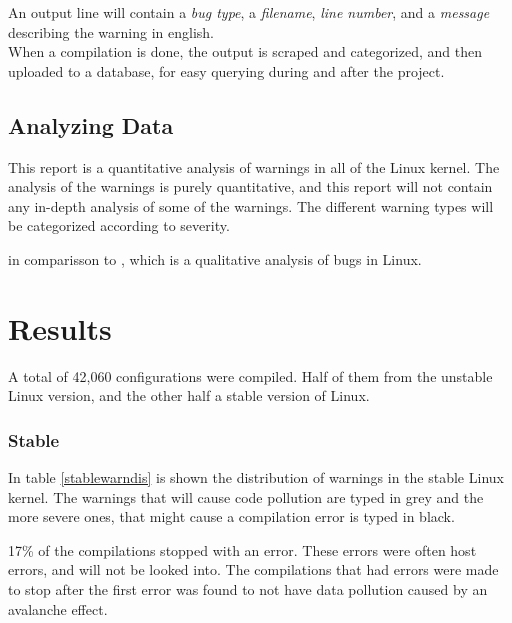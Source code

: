 \documentclass[a4paper,11pt]{report}
\begin{document}
An output line will contain a \emph{bug type}, a \emph{filename}, \emph{line 
number}, and a \emph{message} describing the warning in english.
\\

When a compilation is done, the output is scraped and categorized, and then 
uploaded to a database, for easy querying during and after the project. 


            \section{Analyzing Data}
This report is a quantitative analysis of warnings in all of the Linux kernel.
The analysis of the warnings is purely quantitative, and this report will not 
contain any in-depth analysis of some of the warnings. The different warning 
types will be categorized according to severity.

in comparisson to\cite{42bugs} , which 
is a qualitative analysis of bugs in Linux.




\newpage
\chapter{Results}

A total of 42,060 configurations were compiled. Half of them from the unstable 
Linux version, and the other half a stable version of Linux.

    \subsection{Stable}
In table \ref{stablewarndis} is shown the distribution of warnings in the 
stable Linux kernel. The warnings that will cause code pollution are typed in 
grey and the more severe ones, that might cause a compilation error is typed 
in black.

17\% of the compilations stopped with an error. These errors were often host 
errors, and will not be looked into. The compilations that had errors were made 
to stop after the first error was found to not have data pollution caused by an 
avalanche effect.
\end{document}
